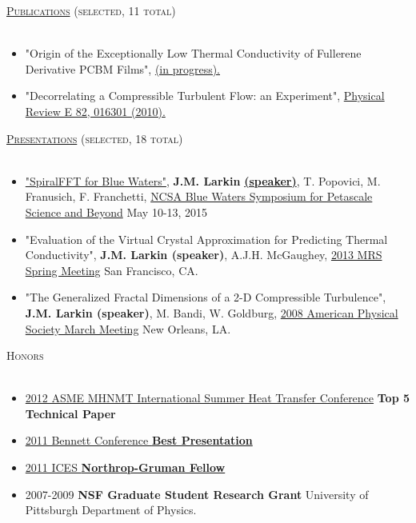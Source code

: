 \documentclass{article}
\newcommand{\lineunder}{\vspace*{-8pt} \\ \hspace*{-18pt} \hrulefill \\}
\newcommand{\header}[1]{{\hspace*{-15pt}\vspace*{6pt} \textsc{#1}} \vspace*{-6pt} \lineunder}
\newenvironment{achievements}{\begin{list}{$\bullet$}{\topsep 0pt \itemsep -2pt}}{\vspace*{4pt}\end{list}}
\begin{document}

\header{\Large{\href{http://jasonlarkin.github.io/pub.html}{Publications} (selected, 11 total)}}
\begin{itemize}[leftmargin=*]
\item "Origin of the Exceptionally Low Thermal Conductivity of Fullerene Derivative  PCBM Films", 
\href{http://jasonlarkin.github.io/projects-phd-pcbm.html}{(in progress).}
\item "Decorrelating a Compressible Turbulent Flow: an Experiment", \href{http://pre.aps.org/abstract/PRE/v82/i1/e016301}{Physical Review E 82, 016301 (2010).}
\end{itemize}

\header{\Large{\href{http://jasonlarkin.org/pres.html}{Presentations} (selected, 18 total)}}
\begin{itemize}[leftmargin=*]
\item \href{https://bluewaters.ncsa.illinois.edu/documents/10157/5a0a0d37-95bf-460b-a7f0-cfadd15abec8}{"SpiralFFT for Blue Waters"}, \textbf{J.M. Larkin} \href{https://www.youtube.com/watch?v=rjbEWeu2Nwc&feature=youtu.be#t=51m53s}{\textbf{(speaker)}}, T. Popovici, M. Franusich, F. Franchetti, \href{https://bluewaters.ncsa.illinois.edu/paid-ime#SPIRAL FFT}{NCSA Blue Waters Symposium for Petascale Science and Beyond} May 10-13, 2015
\item "Evaluation of the Virtual Crystal Approximation for Predicting Thermal Conductivity", \textbf{J.M. Larkin (speaker)}, A.J.H.
   McGaughey, \href{http://www.mrs.org/spring2013/}{2013 MRS Spring Meeting} San Francisco, CA.
\item "The Generalized Fractal Dimensions of a 2-D Compressible Turbulence", \textbf{J.M. Larkin (speaker)}, M. Bandi, W. Goldburg, \href{http://meetings.aps.org/Meeting/MAR08/Content/1017}{2008 American Physical Society March Meeting} New Orleans, LA.

\end{itemize}


\header{\Large{Honors}}
\begin{itemize}[leftmargin=*]
\item \href{http://www.asmeconferences.org/HT2012/}{2012 ASME MHNMT International Summer Heat Transfer Conference} \textbf{Top 5 Technical Paper}
\item \href{http://www.cmu.edu/me/news/archive/2011/bennett-conference.html}{2011 Bennett Conference \textbf{Best Presentation}}
\item \href{http://www.ices.cmu.edu/newsitem.asp?NewsID=749}{2011 ICES \textbf{Northrop-Gruman Fellow}}
\item 2007-2009 \textbf{NSF Graduate Student Research Grant} University of Pittsburgh Department of Physics.
\end{itemize}
\end{document}
